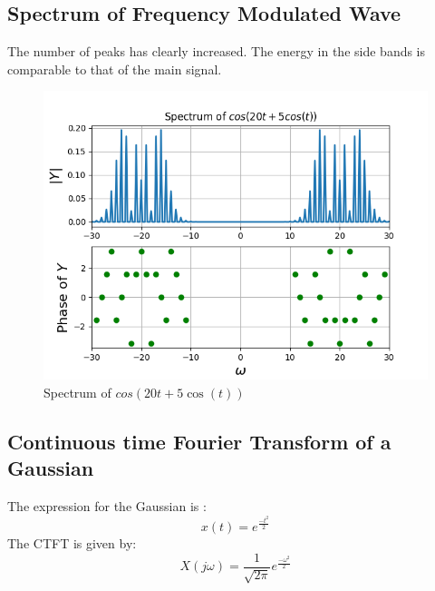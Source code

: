 \documentclass{article}
\begin{document}
\subsection{Spectrum of Frequency Modulated Wave}
The number of peaks has clearly increased. The energy in the side bands is comparable to that of the main signal.
\begin{figure}[h!]
\centering
\includegraphics[scale=0.6]{fig9-7.png}
\caption{Spectrum of $cos(20t +5 \cos(t))$}
\label{fig:universe}
\end{figure}



\subsection{Continuous time Fourier Transform of a Gaussian}

The expression for the Gaussian is :
\begin{equation}
    x(t) = e^{\frac{-t^2}{2}}    
\end{equation}
The CTFT is given by:
\begin{equation}
X(j \omega) = \frac{1}{\sqrt{2 \pi}}e^{\frac{-\omega^2}{2}}    
\end{equation}
\end{document}
